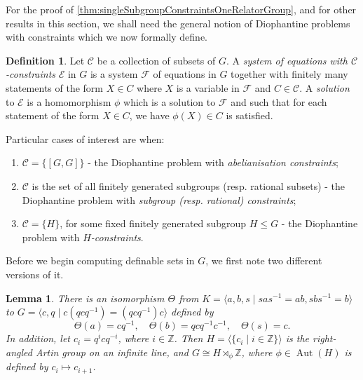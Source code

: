 \documentclass[11pt]{amsart}
\newtheorem{lem}[theorem]{Lemma}
\theoremstyle{definition}
\newtheorem{dfn}[theorem]{Definition}
\numberwithin{theorem}{section}
\DeclareMathOperator{\Aut}{Aut}
\newcommand{\Z}{\mathbb{Z}}
\begin{document}
For the proof of \cref{thm:singleSubgroupConstraintsOneRelatorGroup}, and for other results in this section, we shall need the general notion of Diophantine problems with constraints which we now formally define. 

\begin{dfn}
		Let \(\mathscr{C}\) be a collection of subsets of \(G\). A \emph{system
		of equations with \(\mathscr{C}\)-constraints} \(\mathcal E\) in \(G\)
		is a system \(\mathcal F\) of equations in \(G\) together with finitely
		many statements of the form \(X \in C\) where \(X\) is a variable in
		\(\mathcal F\) and \(C \in \mathscr{C}\). A \emph{solution} to
		\(\mathcal E\) is a homomorphism \(\phi\) which is a solution to
		\(\mathcal F\) and such that for each statement of the form \(X \in C\),
		we have \(\phi(X) \in C\) is satisfied.

		Particular cases of interest are when:
		\begin{enumerate}
			\item \(\mathscr{C} = \{[G, G]\}\) - the Diophantine problem with
					\emph{abelianisation constraints};
			\item \(\mathscr{C}\) is the set of all finitely generated
					subgroups (resp. rational subsets) - the Diophantine
					problem with \emph{subgroup (resp. rational) constraints};
			\item \(\mathscr{C} = \{H\}\), for some fixed finitely generated subgroup
					\(H \leq G\) - the Diophantine problem with \emph{\(H\)-constraints}.
		\end{enumerate}
\end{dfn}

Before we begin computing definable sets in \(G\), we first note two different
versions of it.

  \begin{lem} \label{lem:H-K-iso}
    There is an isomorphism \(\Theta\) from \(K = \langle a, b, s \mid sas^{-1} = ab, sbs^{-1} = b\rangle\) to \(G = \langle c, q \mid c(qcq^{-1}) = (qcq^{-1}) c \rangle\) defined by
    \[
        \Theta(a) = cq^{-1}, \quad \Theta(b) = qcq^{-1} c^{-1}, \quad \Theta(s) = c.
    \]
    In addition, let \(c_i = q^i c q^{-i}\), where \(i \in \mathbb{Z}\). Then
    \(H = \langle \{c_i \mid i \in \mathbb{Z}\} \rangle\) is the
    right-angled Artin group on an infinite line, and \(G \cong H \rtimes_\phi \Z\), where
    \(\phi \in \Aut(H)\) is defined by \(c_i \mapsto c_{i + 1}\).
  \end{lem}
\end{document}
